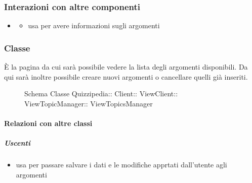 \subsubsection{Interazioni con altre componenti}
\begin{itemize}
\item {}
\begin{itemize}
\item usa  per avere informazioni sugli argomenti
\end{itemize}
\end{itemize}
\subsubsection{Classe }
È la pagina da cui sarà possibile vedere la lista degli argomenti disponibili. Da qui sarà inoltre possibile creare nuovi argomenti o cancellare quelli già inseriti.
\begin{figure}[H]
\centering
\noindent{}
\caption[Schema Classe ViewTopicsManager]{Schema Classe Quizzipedia:: Client:: ViewClient:: ViewTopicManager:: ViewTopicsManager}
\end{figure}
\paragraph{Relazioni con altre classi}
\subparagraph{Uscenti}
\begin{itemize}
\item usa  per passare salvare i dati e le modifiche apprtati dall'utente agli argomenti
\end{itemize}
